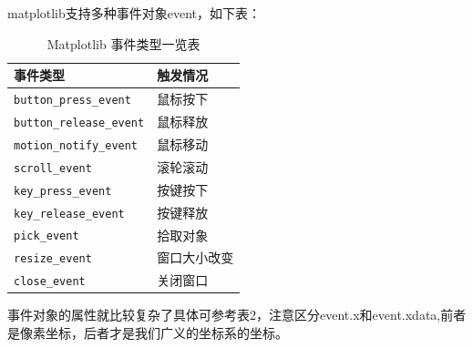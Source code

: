 \documentclass[12pt]{article}
\begin{document}
matplotlib支持多种事件对象event，如下表：
\begin{table}[H]
    \centering
    \begin{tabular}{ll}
        \toprule
        \textbf{事件类型} & \textbf{触发情况} \\
        \midrule
        \texttt{button\_press\_event} & 鼠标按下 \\
        \texttt{button\_release\_event} & 鼠标释放 \\
        \texttt{motion\_notify\_event} & 鼠标移动 \\
        \texttt{scroll\_event} & 滚轮滚动 \\
        \texttt{key\_press\_event} & 按键按下 \\
        \texttt{key\_release\_event} & 按键释放 \\
        \texttt{pick\_event} & 拾取对象 \\
        \texttt{resize\_event} & 窗口大小改变 \\
        \texttt{close\_event} & 关闭窗口 \\
        \bottomrule
    \end{tabular}
    \caption{Matplotlib 事件类型一览表}
    \label{tab:matplotlib_events}
\end{table}

事件对象的属性就比较复杂了具体可参考表2，注意区分event.x和event.xdata,前者是像素坐标，后者才是我们广义的坐标系的坐标。
\end{document}

